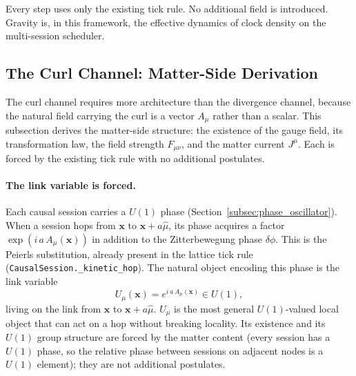 Every step uses only the existing tick rule. No additional field is
introduced. Gravity is, in this framework, the effective dynamics of
clock density on the multi-session scheduler.

\subsection{The Curl Channel: Matter-Side Derivation}
\label{subsec:em_matter_side}

The curl channel requires more architecture than the divergence
channel, because the natural field carrying the curl is a vector
$A_\mu$ rather than a scalar.
This subsection derives the matter-side structure: the existence of
the gauge field, its transformation law, the field strength $F_{\mu\nu}$,
and the matter current $J^\mu$. Each is forced by the existing tick
rule with no additional postulates.

\paragraph{The link variable is forced.}
Each causal session carries a $U(1)$ phase
(Section~\ref{subsec:phase_oscillator}). When a session hops from
$\mathbf{x}$ to $\mathbf{x} + a\hat{\mu}$, its phase acquires a factor
$\exp(i\,a\,A_\mu(\mathbf{x}))$ in addition to the Zitterbewegung
phase $\delta\phi$. This is the Peierls substitution, already present
in the lattice tick rule (\texttt{CausalSession.\_kinetic\_hop}).
The natural object encoding this phase is the link variable
\begin{equation}
    U_\mu(\mathbf{x}) = e^{i\,a\,A_\mu(\mathbf{x})} \in U(1),
    \label{eq:link_variable}
\end{equation}
living on the link from $\mathbf{x}$ to $\mathbf{x} + a\hat{\mu}$.
$U_\mu$ is the most general $U(1)$-valued local object that can act
on a hop without breaking locality. Its existence and its $U(1)$
group structure are forced by the matter content (every session has a
$U(1)$ phase, so the relative phase between sessions on adjacent
nodes is a $U(1)$ element); they are not additional postulates.

